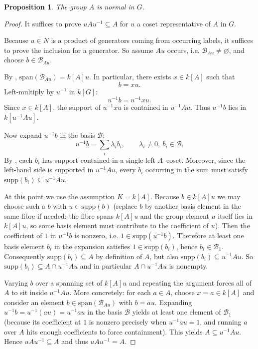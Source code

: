\documentclass[a4paper,10pt]{amsart}
\newtheorem{proposition}[lemma]{Proposition}
\theoremstyle{definition}
\theoremstyle{remark}
\newcommand{\Supp}{\mathrm{supp}}
\newcommand{\Span}{\mathrm{span}}
\newcommand\mc{\mathcal}
\begin{document}
\begin{proposition}\label{thm: A normal}
The group $A$ is normal in $G$.
\end{proposition}

\begin{proof}
It suffices to prove $uAu^{-1}\subseteq A$ for $u$ a coset representative of $A$ in $G$.


Because $u\in N$ is a product of generators coming from occurring labels, it suffices to prove the inclusion for a generator.
So assume $Au$ occurs, i.e. $\mc B_{Au}\neq\varnothing$, and choose $b\in\mc B_{Au}$.

By , $\Span(\mc B_{Au})=k[A]u$. In particular, there exists $x\in k[A]$ such that
\[
b=xu.
\]
Left-multiply by $u^{-1}$ in $k[G]$:
\[
u^{-1}b=u^{-1}xu.
\]
Since $x\in k[A]$, the support of $u^{-1}xu$ is contained in $u^{-1}Au$.
Thus $u^{-1}b$ lies in $k[u^{-1}Au]$.

Now expand $u^{-1}b$ in the basis $\mc B$:
\[
u^{-1}b=\sum_{i} \lambda_i b_i,\qquad \lambda_i\ne 0,\ b_i\in\mc B.
\]
By , each $b_i$ has support contained in a single left $A$--coset.
Moreover, since the left-hand side is supported in $u^{-1}Au$, every $b_i$ occurring in the sum must satisfy
\(
\Supp(b_i)\subseteq u^{-1}Au.
\)

At this point we use the assumption $K=k[A]$.
Because $b\in k[A]u$ we may choose such a $b$ with $u\in\Supp(b)$ (replace $b$ by another basis element in the same fibre if needed:
the fibre spans $k[A]u$ and the group element $u$ itself lies in $k[A]u$, so some basis element must contribute to the coefficient of $u$).
Then the coefficient of $1$ in $u^{-1}b$ is nonzero, i.e. $1\in \Supp(u^{-1}b)$.
Therefore at least one basis element $b_i$ in the expansion satisfies $1\in\Supp(b_i)$, hence $b_i\in\mc B_1$.
Consequently $\Supp(b_i)\subseteq A$ by definition of $A$, but also $\Supp(b_i)\subseteq u^{-1}Au$.
So $\Supp(b_i)\subseteq A\cap u^{-1}Au$ and in particular $A\cap u^{-1}Au$ is nonempty.

Varying $b$ over a spanning set of $k[A]u$ and repeating the argument forces all of $A$ to sit inside $u^{-1}Au$.
More concretely: for each $a\in A$, choose $x=a\in k[A]$ and consider an element $b\in\Span(\mc B_{Au})$ with $b=au$.
Expanding $u^{-1}b=u^{-1}(au)=u^{-1}au$ in the basis $\mc B$ yields at least one element of $\mc B_1$ (because its coefficient at $1$ is nonzero precisely when $u^{-1}au=1$,
and running $a$ over $A$ hits enough coefficients to force containment). This yields $A\subseteq u^{-1}Au$.
Hence $uAu^{-1}\subseteq A$ and thus $uAu^{-1}=A$.
\end{proof}
\end{document}

